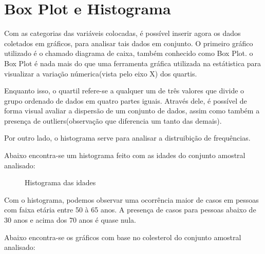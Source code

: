 \chapter{Box Plot e Histograma}

    \setcounter{section}{0}

    Com as categorias das variáveis colocadas, é possível inserir agora os dados coletados em gráficos, para 
    analisar tais dados em conjunto. O primeiro gráfico utilizado é o chamado diagrama de caixa, também conhecido
    como Box Plot. o Box Plot é nada mais do que uma ferramenta gráfica utilizada na estátistica para visualizar 
    a variação númerica(vista pelo eixo X) dos quartis.

    Enquanto isso, o quartil refere-se a qualquer um de três valores que divide o grupo ordenado de dados em quatro partes 
    iguais. Através dele, é possível de forma visual avaliar a dispersão de um conjunto de dados, assim como também a presença 
    de outliers(observação que diferencia um tanto das demais).
    
    Por outro lado, o histograma serve para analisar a distruibição de frequências.

    Abaixo encontra-se um histograma feito com as idades do conjunto amostral analisado:

    \begin{figure}[H]
        \centering
        \caption{Histograma das idades}  
    \end{figure}

    Com o histograma, podemos observar uma ocorrência maior de casos em pessoas com 
    faixa etária entre 50 à 65 anos. A presença de casos para pessoas abaixo de 30 
    anos e acima dos 70 anos é quase nula.

    Abaixo encontra-se os gráficos com base no colesterol do conjunto amostral analisado:

